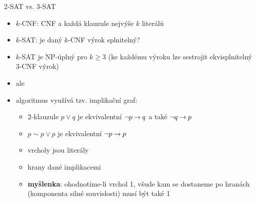 \documentclass{beamer}
\begin{document}
\begin{frame}{2-SAT vs. 3-SAT}

    \begin{itemize}
        \item \alert{$k$-CNF}: CNF a každá klauzule nejvýše $k$ literálů
        \item \alert{$k$-SAT}: je daný $k$-CNF výrok splnitelný?
        \item $k$-SAT je NP-úplný pro $k\geq 3$ (ke každému výroku lze sestrojit \alert{ekvisplnitelný} 3-CNF výrok)
        \item ale 
        \item algoritmus využívá tzv. \alert{implikační graf}:         
        \begin{itemize}
            \item 2-klauzule $p\lor q$ je ekvivalentní $\neg p\mathbin{\rightarrow} q$ a také $\neg q\mathbin{\rightarrow} p$
            \item $p\sim p\lor p$ je ekvivalentní $\neg p\mathbin{\rightarrow} p$
            \item vrcholy jsou literály
            \item hrany dané implikacemi
            \item \textbf{myšlenka}: ohodnotíme-li vrchol 1, všude kam se dostaneme po hranách (\alert{komponenta} silné souvislosti) musí být také 1
        \end{itemize}        
    \end{itemize}    
    
\end{frame}
\end{document}
